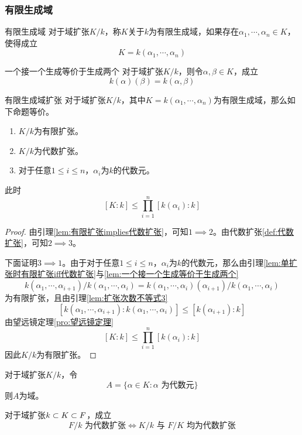 \subsubsection{有限生成域}

\begin{definition}{有限生成域}
	对于域扩张$K/k$，称$K$关于$k$为有限生成域，如果存在$\alpha_1,\cdots,\alpha_n\in K$，使得成立%
	$$
	K=k(\alpha_1,\cdots,\alpha_n)
	$$
\end{definition}

\begin{lemma}{}{一个接一个生成等价于生成两个}
	对于域扩张$K/k$，则令$\alpha,\beta\in K$，成立%
	$$
	k(\alpha)(\beta)=k(\alpha,\beta)
	$$
\end{lemma}

\begin{proposition}{}{有限生成域扩张}
	对于域扩张$K/k$，其中$K=k(\alpha_1,\cdots,\alpha_n)$为有限生成域，那么如下命题等价。
	\begin{enumerate}
		\item $K/k$为有限扩张。
		\item $K/k$为代数扩张。
		\item 对于任意$1\le i \le n$，$\alpha_i$为$k$的代数元。
	\end{enumerate}
	此时
	$$
	[K:k]\le \prod_{i=1}^{n}[k(\alpha_i):k]
	$$
\end{proposition}

\begin{proof}
	由引理\ref{lem:有限扩张implies代数扩张}，可知$1\implies 2$。由代数扩张\ref{def:代数扩张}，可知$2\implies 3$。
	
	下面证明$3\implies 1$。由于对于任意$1\le i \le n$，$\alpha_i$为$k$的代数元，那么由引理\ref{lem:单扩张时有限扩张iff代数扩张}与\ref{lem:一个接一个生成等价于生成两个}
	$$
	k(\alpha_1,\cdots,\alpha_{i+1})/k(\alpha_1,\cdots,\alpha_{i})
	=k(\alpha_1,\cdots,\alpha_i)(\alpha_{i+1})/k(\alpha_1,\cdots,\alpha_{i})
	$$
	为有限扩张，且由引理\ref{lem:扩张次数不等式3}
	$$
	[k(\alpha_1,\cdots,\alpha_{i+1}):k(\alpha_1,\cdots,\alpha_{i})]
	\le [k(\alpha_{i+1}):k]
	$$
	由望远镜定理\ref{pro:望远镜定理}
	$$
	[K:k]\le \prod_{i=1}^{n}[k(\alpha_i):k]
	$$
	因此$K/k$为有限扩张。
\end{proof}

\begin{corollary}
	对于域扩张$K/k$，令%
	$$
	A=\{ \alpha\in K:\alpha\text{ 为代数元} \}
	$$
	则$A$为域。
\end{corollary}

\begin{corollary}
	对于域扩张$k\subset K\subset F$，成立%
	$$
	F/k\text{ 为代数扩张}
	\iff
	K/k\text{ 与 }F/K\text{ 均为代数扩张}
	$$
\end{corollary}

